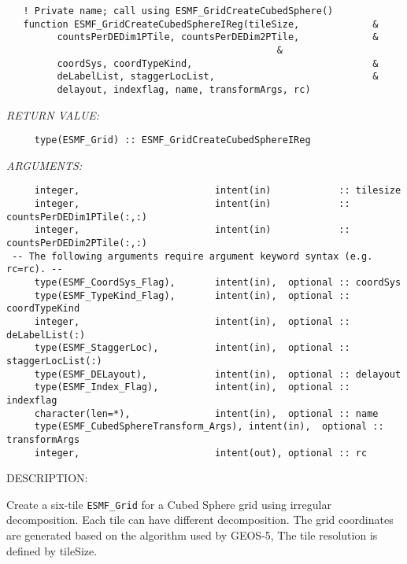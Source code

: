  
\begin{verbatim}   ! Private name; call using ESMF_GridCreateCubedSphere()
   function ESMF_GridCreateCubedSphereIReg(tileSize,             &
         countsPerDEDim1PTile, countsPerDEDim2PTile,             &
                                                &        
         coordSys, coordTypeKind,                                &
         deLabelList, staggerLocList,                            &
         delayout, indexflag, name, transformArgs, rc)\end{verbatim}{\em RETURN VALUE:}
\begin{verbatim}     type(ESMF_Grid) :: ESMF_GridCreateCubedSphereIReg\end{verbatim}{\em ARGUMENTS:}
\begin{verbatim}     integer,                        intent(in)            :: tilesize
     integer,                        intent(in)            :: countsPerDEDim1PTile(:,:)
     integer,                        intent(in)            :: countsPerDEDim2PTile(:,:)
 -- The following arguments require argument keyword syntax (e.g. rc=rc). --
     type(ESMF_CoordSys_Flag),       intent(in),  optional :: coordSys
     type(ESMF_TypeKind_Flag),       intent(in),  optional :: coordTypeKind
     integer,                        intent(in),  optional :: deLabelList(:)
     type(ESMF_StaggerLoc),          intent(in),  optional :: staggerLocList(:)
     type(ESMF_DELayout),            intent(in),  optional :: delayout
     type(ESMF_Index_Flag),          intent(in),  optional :: indexflag
     character(len=*),               intent(in),  optional :: name
     type(ESMF_CubedSphereTransform_Args), intent(in),  optional :: transformArgs
     integer,                        intent(out), optional :: rc
 \end{verbatim}
{\sf DESCRIPTION:\\ }


     Create a six-tile {\tt ESMF\_Grid} for a Cubed Sphere grid using irregular decomposition.  Each tile can
     have different decomposition.  The grid coordinates are generated based on the algorithm used by GEOS-5,
     The tile resolution is defined by tileSize.
  
